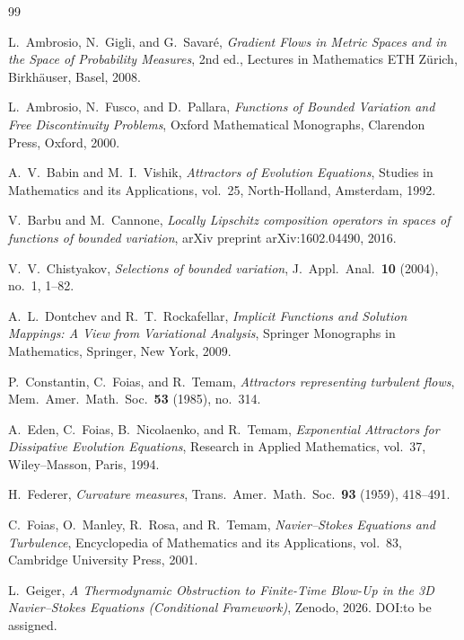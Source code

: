 \documentclass[12pt,a4paper]{article}
\theoremstyle{definition}
\theoremstyle{plain}
\theoremstyle{remark}
\begin{document}
\begin{thebibliography}{99}

L.~Ambrosio, N.~Gigli, and G.~Savar\'e,
\emph{Gradient Flows in Metric Spaces and in the Space of
Probability Measures},
2nd ed., Lectures in Mathematics ETH Z\"urich,
Birkh\"auser, Basel, 2008.

L.~Ambrosio, N.~Fusco, and D.~Pallara,
\emph{Functions of Bounded Variation and Free Discontinuity Problems},
Oxford Mathematical Monographs, Clarendon Press, Oxford, 2000.

A.~V.~Babin and M.~I.~Vishik,
\emph{Attractors of Evolution Equations},
Studies in Mathematics and its Applications, vol.~25,
North-Holland, Amsterdam, 1992.

V.~Barbu and M.~Cannone,
\emph{Locally Lipschitz composition operators in spaces of
functions of bounded variation},
arXiv preprint arXiv:1602.04490, 2016.

V.~V.~Chistyakov,
\emph{Selections of bounded variation},
J.~Appl.\ Anal.\ \textbf{10} (2004), no.~1, 1--82.

A.~L.~Dontchev and R.~T.~Rockafellar,
\emph{Implicit Functions and Solution Mappings: A View from
Variational Analysis},
Springer Monographs in Mathematics, Springer, New York, 2009.

P.~Constantin, C.~Foias, and R.~Temam,
\emph{Attractors representing turbulent flows},
Mem.\ Amer.\ Math.\ Soc.\ \textbf{53} (1985), no.~314.

A.~Eden, C.~Foias, B.~Nicolaenko, and R.~Temam,
\emph{Exponential Attractors for Dissipative Evolution Equations},
Research in Applied Mathematics, vol.~37,
Wiley--Masson, Paris, 1994.

H.~Federer,
\emph{Curvature measures},
Trans.\ Amer.\ Math.\ Soc.\ \textbf{93} (1959), 418--491.

C.~Foias, O.~Manley, R.~Rosa, and R.~Temam,
\emph{Navier--Stokes Equations and Turbulence},
Encyclopedia of Mathematics and its Applications, vol.~83,
Cambridge University Press, 2001.

L.~Geiger,
\emph{A Thermodynamic Obstruction to Finite-Time Blow-Up in the 3D
Navier--Stokes Equations (Conditional Framework)},
Zenodo, 2026.  DOI:\@ to be assigned.


\end{thebibliography}
\end{document}
